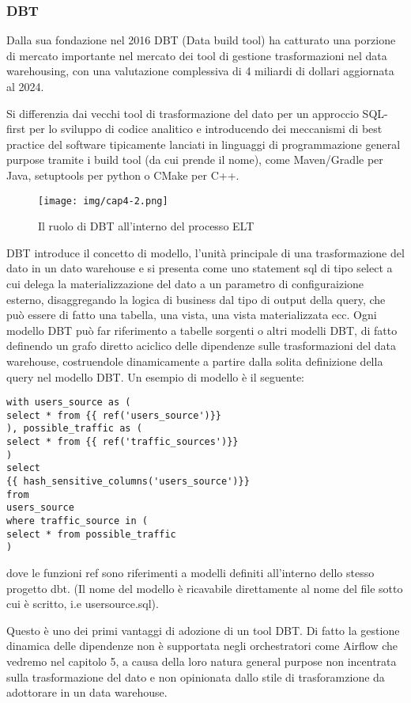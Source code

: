 \documentclass[a4paper,12pt]{report}
\begin{document}
\subsubsection{DBT}
\noindent
Dalla sua fondazione nel 2016  DBT (Data build tool) ha catturato una porzione di mercato importante nel mercato dei tool di gestione trasformazioni nel data warehousing, con una valutazione complessiva di 4 miliardi di dollari aggiornata al 2024.

\noindent
Si differenzia dai vecchi tool di trasformazione del dato per un approccio SQL-first per lo sviluppo di codice analitico e introducendo dei meccanismi di best practice del software tipicamente lanciati in linguaggi di programmazione general purpose tramite i build tool (da cui prende il nome), come Maven/Gradle per Java, setuptools per python o CMake per C++.

\begin{figure}[h]
    \centering
    \texttt{[image: img/cap4-2.png]}
    \caption{Il ruolo di DBT all'interno del processo ELT }
\end{figure}

\noindent
DBT introduce il concetto di modello, l’unità principale di una trasformazione del dato in un dato warehouse e si presenta come uno statement sql di tipo select a cui delega la materializzazione del dato a un parametro di configuraizione esterno, disaggregando la logica di business dal tipo di output della query, che può essere di fatto una tabella, una vista, una vista materializzata ecc. Ogni modello DBT può far riferimento a tabelle sorgenti o altri modelli DBT, di fatto definendo un grafo diretto aciclico delle dipendenze sulle trasformazioni del data warehouse, costruendole dinamicamente a partire dalla solita definizione della query nel modello DBT. Un esempio di modello è il seguente:

\begin{verbatim}
with users_source as (
select * from {{ ref('users_source')}}
), possible_traffic as (
select * from {{ ref('traffic_sources')}}
)
select
{{ hash_sensitive_columns('users_source')}}
from
users_source
where traffic_source in (
select * from possible_traffic
)
\end{verbatim}

\noindent
dove le funzioni ref sono riferimenti a modelli definiti all’interno dello stesso progetto dbt. (Il nome del modello è ricavabile direttamente al nome del file sotto cui è scritto, i.e usersource.sql).

\noindent
Questo è uno dei primi vantaggi di adozione di un tool DBT. Di fatto la gestione dinamica delle dipendenze non è supportata negli orchestratori come Airflow che vedremo nel capitolo 5, a causa della loro natura general purpose non incentrata sulla trasformazione del dato e non opinionata dallo stile di trasforamzione da adottorare in un data warehouse. 
\end{document}
